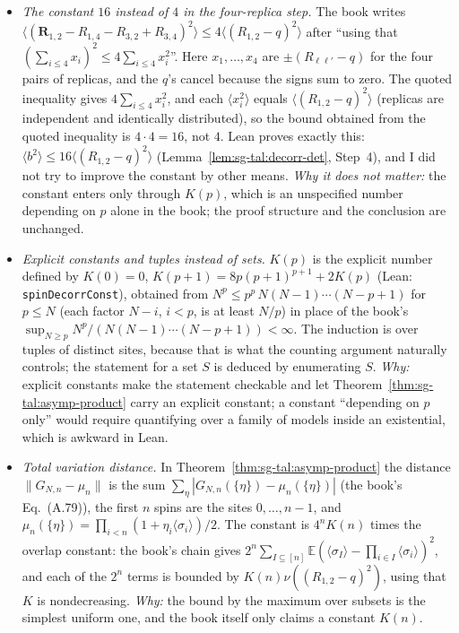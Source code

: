 \begin{remark}
\begin{itemize}
\item \emph{The constant $16$ instead of $4$ in the four-replica step.}
The book writes $\langle(\mathbf R_{1,2}-R_{1,4}-R_{3,2}+R_{3,4})^2\rangle\le4\langle(R_{1,2}-q)^2\rangle$ after ``using that $(\sum_{i\le4}x_i)^2\le4\sum_{i\le4}x_i^2$''. Here $x_1,\dots,x_4$ are $\pm(R_{\ell\ell'}-q)$ for the four pairs of replicas, and the $q$'s cancel because the signs sum to zero. The quoted inequality gives $4\sum_{i\le4}x_i^2$, and each $\langle x_i^2\rangle$ equals $\langle(R_{1,2}-q)^2\rangle$ (replicas are independent and identically distributed), so the bound obtained from the quoted inequality is $4\cdot4=16$, not $4$. Lean proves exactly this: $\langle b^2\rangle\le16\langle(R_{1,2}-q)^2\rangle$ (Lemma~\ref{lem:sg-tal:decorr-det}, Step~4), and I did not try to improve the constant by other means.
\emph{Why it does not matter:} the constant enters only through $K(p)$, which is an unspecified number depending on $p$ alone in the book; the proof structure and the conclusion are unchanged.

\item \emph{Explicit constants and tuples instead of sets.}
$K(p)$ is the explicit number defined by $K(0)=0$, $K(p+1)=8p(p+1)^{p+1}+2K(p)$ (Lean: \texttt{spinDecorrConst}), obtained from $N^p\le p^p\,N(N-1)\cdots(N-p+1)$ for $p\le N$ (each factor $N-i$, $i<p$, is at least $N/p$) in place of the book's $\sup_{N\ge p}N^p/(N(N-1)\cdots(N-p+1))<\infty$. The induction is over tuples of distinct sites, because that is what the counting argument naturally controls; the statement for a set $S$ is deduced by enumerating $S$.
\emph{Why:} explicit constants make the statement checkable and let Theorem~\ref{thm:sg-tal:asymp-product} carry an explicit constant; a constant ``depending on $p$ only'' would require quantifying over a family of models inside an existential, which is awkward in Lean.

\item \emph{Total variation distance.} In Theorem~\ref{thm:sg-tal:asymp-product} the distance $\|G_{N,n}-\mu_n\|$ is the sum $\sum_\eta|G_{N,n}(\{\eta\})-\mu_n(\{\eta\})|$ (the book's Eq.~(A.79)), the first $n$ spins are the sites $0,\dots,n-1$, and $\mu_n(\{\eta\})=\prod_{i<n}(1+\eta_i\langle\sigma_i\rangle)/2$. The constant is $4^nK(n)$ times the overlap constant: the book's chain gives $2^n\sum_{I\subseteq[n]}\mathbb{E}(\langle\sigma_I\rangle-\prod_{i\in I}\langle\sigma_i\rangle)^2$, and each of the $2^n$ terms is bounded by $K(n)\nu((R_{1,2}-q)^2)$, using that $K$ is nondecreasing. \emph{Why:} the bound by the maximum over subsets is the simplest uniform one, and the book itself only claims a constant $K(n)$.


\end{itemize}
\end{remark}
